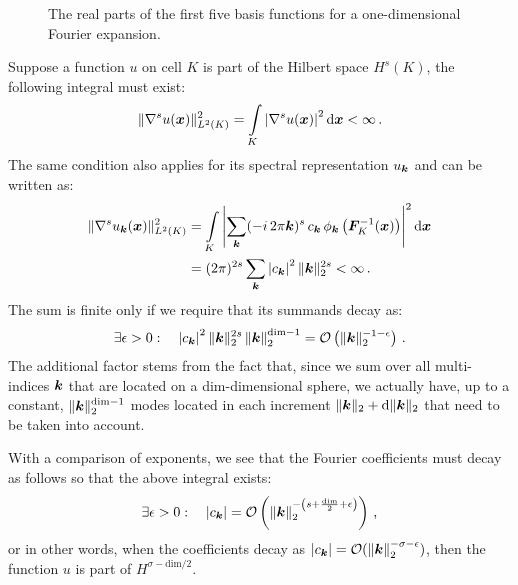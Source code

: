 \begin{figure}
\centering

\caption[The first basis functions for a Fourier expansion.]{The real parts of the first five basis functions for a one-dimensional Fourier expansion.}
\label{fig:fourier}
\end{figure}

Suppose a function $u$ on cell $K$ is part of the Hilbert space $H^s(K)$, the following integral must exist:
\begin{align}
\| \nabla^s u(\vec{x}) \|_{L^2(K)}^2 = \int\limits_K \left| \nabla^s u(\vec{x}) \right|^2 \differential{\vec{x}} < \infty \,\text{.}
\end{align}
The same condition also applies for its spectral representation $u_{\tuple{k}}$ and can be written as:
\begin{align}
\| \nabla^s u_{\tuple{k}}(\vec{x}) \|_{L^2(K)}^2 &= \int\limits_K \left| \sum\limits_{\tuple{k}} (-i \, 2 \pi \tuple{k})^s \, c_\tuple{k} \, \phi_\tuple{k}\left(\mat{F}_K^{-1}(\vec{x})\right) \right|^2 \differential{\vec{x}} \\
&= (2 \pi)^{2s} \sum\limits_{\tuple{k}} \left| c_\tuple{k} \right|^2 \|\tuple{k}\|_2^{2s} < \infty \,\text{.}
\end{align}
The sum is finite only if we require that its summands decay as:
\begin{align}
\exists \epsilon > 0 : \quad \left| c_\tuple{k} \right|^2 \|\tuple{k}\|_2^{2s} \left\| \tuple{k} \right\|_2^{\text{dim} - 1} = \mathcal{O}\left( \|\tuple{k}\|_2^{-1-\epsilon} \right) \,\text{.}
\end{align}
The additional factor stems from the fact that, since we sum over all multi-indices $\tuple{k}$ that are located on a dim-dimensional sphere, we actually have, up to a constant, $\|\tuple{k}\|_2^{\text{dim}-1}$ modes located in each increment $\|\tuple{k}\|_2 + \differential{\|\tuple{k}\|_2}$ that need to be taken into account. \textcite{dealiistep-27}

With a comparison of exponents, we see that the Fourier coefficients must decay as follows so that the above integral exists:
\begin{align}
\exists \epsilon > 0 : \quad |c_\tuple{k}| = \mathcal{O}\left( \left\|\tuple{k}\right\|_2^{-\left(s + \frac{\text{dim}}{2} + \epsilon \right)} \right) \,\text{,}
\end{align}
or in other words, when the coefficients decay as $\left| c_\tuple{k} \right| = \mathcal{O}( \left\|\tuple{k}\right\|_2^{-\sigma-\epsilon} )$, then the function $u$ is part of $H^{\sigma - \text{dim}/2}$. \textcite{dealiistep-27}

